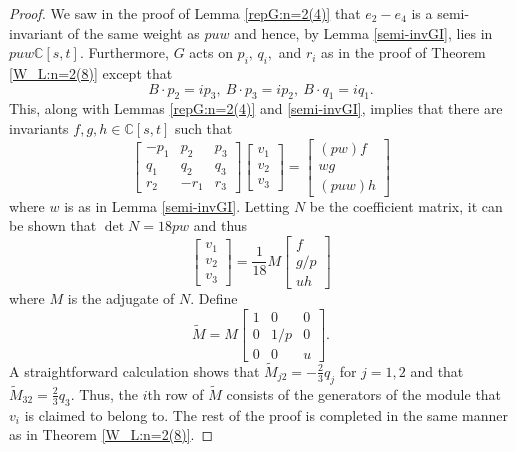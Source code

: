 \documentclass[a4paper,reqno]{amsart}
\theoremstyle{definition}
\theoremstyle{remark} \newtheorem{remark}[theorem]{Remark}
\numberwithin{equation}{section}
\begin{document}
\begin{proof}
    We saw in the proof of Lemma \ref{repG:n=2(4)} that \(e_2 - e_4\) is a semi-invariant of the same weight as \(puw\) and hence, by Lemma \ref{semi-invGI}, lies in \(puw\mathbb{C}[s,t]\). Furthermore, \(G\) acts on \(p_i,\, q_i,\) and \(r_i\) as in the proof of Theorem \ref{W_L:n=2(8)} except that
    \begin{equation*}
        B \cdot p_2 = ip_3, \: B \cdot p_3 = ip_2, \: B \cdot q_1 = iq_1.
    \end{equation*}
    This, along with Lemmas \ref{repG:n=2(4)} and \ref{semi-invGI}, implies that there are invariants \(f,g,h \in \mathbb{C}[s,t]\) such that
    \begin{equation*}
        \begin{bmatrix}
            -p_1 & p_2 & p_3 \\
            q_1 & q_2 & q_3 \\
            r_2 & -r_1 & r_3
        \end{bmatrix}
        \begin{bmatrix}
            v_1 \\
            v_2 \\
            v_3
        \end{bmatrix}
        =
        \begin{bmatrix}
            (pw)f \\
            wg \\
            (puw)h
        \end{bmatrix}
    \end{equation*}
    where \(w\) is as in Lemma \ref{semi-invGI}. Letting \(N\) be the coefficient matrix, it can be shown that \(\det N = 18pw\) and thus
    \begin{equation*}
        \begin{bmatrix}
            v_1 \\
            v_2 \\
            v_3
        \end{bmatrix}
        = \frac{1}{18}M
        \begin{bmatrix}
            f \\
            g/p \\
            uh
        \end{bmatrix}
    \end{equation*}
    where \(M\) is the adjugate of \(N\). Define
    \begin{equation*}
        \tilde{M} = M
        \begin{bmatrix}
            1 & 0 & 0 \\
            0 & 1/p & 0 \\
            0 & 0 & u
        \end{bmatrix}.
    \end{equation*}
    A straightforward calculation shows that \(\tilde{M}_{j2} = -\frac{2}{3}q_j\) for \(j = 1,2\) and that \(\tilde{M}_{32} = \frac{2}{3}q_3\). Thus, the \(i\)th row of \(\tilde{M}\) consists of the generators of the module that \(v_i\) is claimed to belong to. The rest of the proof is completed in the same manner as in Theorem \ref{W_L:n=2(8)}.
\end{proof}
\end{document}
